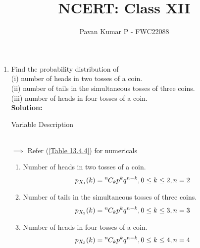 \documentclass{article}
\newcommand{\solution}{\noindent \textbf{Solution: }}
\newcommand*{\permcomb}[4][0mu]{{{}^{#3}\mkern#1#2_{#4}}}
\newcommand*{\comb}[1][-1mu]{\permcomb[#1]{C}}
\begin{document}
\title{NCERT: Class XII}
\author{\Large Pavan Kumar P - FWC22088}
\date{}

\maketitle

\begin{enumerate}[label=13.\arabic{enumi}.\arabic{enumii}]

\setcounter{enumi}{3}
\setcounter{enumii}{4}

\item Find the probability distribution of\\
(i) number of heads in two tosses of a coin.\\
(ii) number of tails in the simultaneous tosses of three coins.\\
(iii) number of heads in four tosses of a coin.\\[1ex]
\solution
\begin{table}[h]
 \centering
	
	\caption{Variable Description }
	\label{Table 13.4.4}
\end{table}\\
$\implies$ Refer (\ref{Table 13.4.4}) for numericals\\
\begin{enumerate} 
\item Number of heads in two tosses of a coin.\\
 \begin{align}
  p_{X_1}(k) &= \comb{n}{k}p^{k}q^{n-k},  0\leq k\leq 2,n=2
\end{align}

\item Number of tails in the simultaneous tosses of three coins.\\
 \begin{align}
  p_{X_2}(k) &= \comb{n}{k}p^{k}q^{n-k},  0\leq k\leq 3,n=3 
\end{align}

\item Number of heads in four tosses of a coin.\\
 \begin{align}
  p_{X_3}(k) &= \comb{n}{k}p^{k}q^{n-k},  0\leq k\leq 4,n=4
\end{align}

\end{enumerate}
\end{enumerate}
\end{document}
